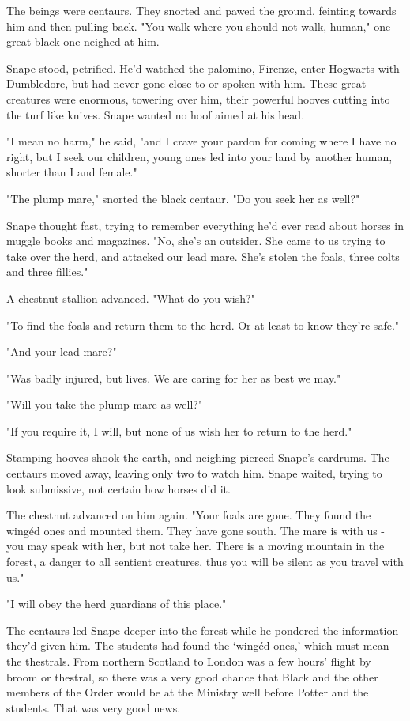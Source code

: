 The beings were centaurs. They snorted and pawed the ground, feinting towards him and then pulling back. "You walk where you should not walk, human," one great black one neighed at him.

Snape stood, petrified. He'd watched the palomino, Firenze, enter Hogwarts with Dumbledore, but had never gone close to or spoken with him. These great creatures were enormous, towering over him, their powerful hooves cutting into the turf like knives. Snape wanted no hoof aimed at his head.

"I mean no harm," he said, "and I crave your pardon for coming where I have no right, but I seek our children, young ones led into your land by another human, shorter than I and female."

"The plump mare," snorted the black centaur. "Do you seek her as well?"

Snape thought fast, trying to remember everything he'd ever read about horses in muggle books and magazines. "No, she's an outsider. She came to us trying to take over the herd, and attacked our lead mare. She's stolen the foals, three colts and three fillies."

A chestnut stallion advanced. "What do you wish?"

"To find the foals and return them to the herd. Or at least to know they're safe."

"And your lead mare?"

"Was badly injured, but lives. We are caring for her as best we may."

"Will you take the plump mare as well?"

"If you require it, I will, but none of us wish her to return to the herd."

Stamping hooves shook the earth, and neighing pierced Snape's eardrums. The centaurs moved away, leaving only two to watch him. Snape waited, trying to look submissive, not certain how horses did it.

The chestnut advanced on him again. "Your foals are gone. They found the wingéd ones and mounted them. They have gone south. The mare is with us - you may speak with her, but not take her. There is a moving mountain in the forest, a danger to all sentient creatures, thus you will be silent as you travel with us."

"I will obey the herd guardians of this place."

The centaurs led Snape deeper into the forest while he pondered the information they'd given him. The students had found the `wingéd ones,' which must mean the thestrals. From northern Scotland to London was a few hours' flight by broom or thestral, so there was a very good chance that Black and the other members of the Order would be at the Ministry well before Potter and the students. That was very good news.

